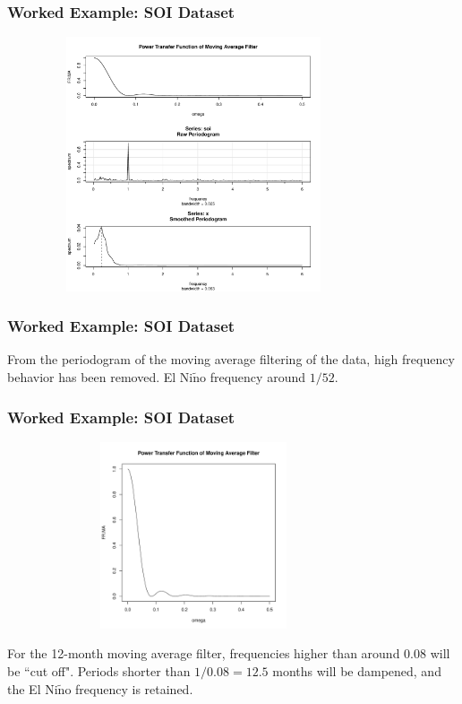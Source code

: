 \documentclass[%
xcolor=pdftex]{beamer}
\begin{document}
\begin{frame}
\frametitle{Worked Example: SOI Dataset}

\includegraphics[width=110mm, height=75mm]{raw.pdf}

\end{frame}



\begin{frame}
\frametitle{Worked Example: SOI Dataset}

From the periodogram of the moving average filtering of the data, high frequency behavior has been removed. El Ni$\tilde{\text{n}}$o frequency around $1/52$. 

\end{frame}





\begin{frame}
\frametitle{Worked Example: SOI Dataset}

\includegraphics[width=110mm, height=55mm]{ma.pdf}

For the 12-month moving average filter, frequencies higher than around 0.08 will be ``cut off". Periods shorter than $1/0.08 = 12.5$ months will be dampened, and the El Ni$\tilde{\text{n}}$o frequency is retained.

\end{frame}
\end{document}
